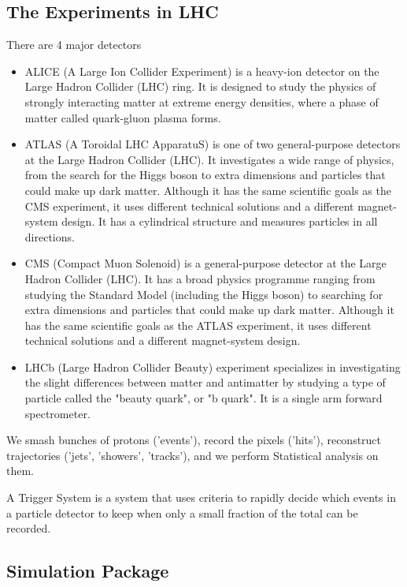\subsection{The Experiments in LHC}

There are 4 major detectors
\begin{itemize}
  \item ALICE (A Large Ion Collider Experiment) is a heavy-ion detector on the Large Hadron Collider (LHC) ring. It is designed to study the physics of strongly interacting matter at extreme energy densities, where a phase of matter called quark-gluon plasma forms.
  \item ATLAS (A Toroidal LHC ApparatuS) is one of two general-purpose detectors at the Large Hadron Collider (LHC). It investigates a wide range of physics, from the search for the Higgs boson to extra dimensions and particles that could make up dark matter. Although it has the same scientific goals as the CMS experiment, it uses different technical solutions and a different magnet-system design. It has a cylindrical structure and measures particles in all directions.
  \item CMS (Compact Muon Solenoid) is a general-purpose detector at the Large Hadron Collider (LHC). It has a broad physics programme ranging from studying the Standard Model (including the Higgs boson) to searching for extra dimensions and particles that could make up dark matter. Although it has the same scientific goals as the ATLAS experiment, it uses different technical solutions and a different magnet-system design.
  \item LHCb (Large Hadron Collider Beauty) experiment specializes in investigating the slight differences between matter and antimatter by studying a type of particle called the "beauty quark", or "b quark". It is a single arm forward spectrometer.
\end{itemize}

We smash bunches of protons ('events'), record the pixels ('hits'), reconstruct trajectories ('jets', 'showers', 'tracks'), and we perform Statistical analysis on them.

A Trigger System is a system that uses criteria to rapidly decide which events in a particle detector to keep when only a small fraction of the total can be recorded.


\subsection{Simulation Package}

